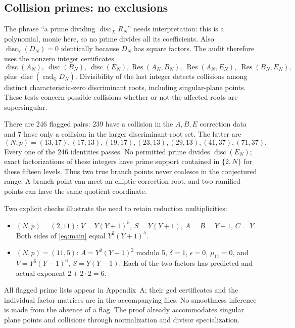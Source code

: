 \documentclass[11pt,a4paper]{article}
\begin{document}
\subsection{Collision primes: no exclusions}
The phrase ``a prime dividing $\operatorname{disc}_X R_N$'' needs interpretation: this is a polynomial, monic here, so no prime divides all its coefficients. Also $\operatorname{disc}_Y(D_N)=0$ identically because $D_N$ has square factors. The audit therefore uses the nonzero integer certificates
\[
 \operatorname{disc}(A_N),\ \operatorname{disc}(B_N),\ \operatorname{disc}(E_N),
 \operatorname{Res}(A_N,B_N),\ \operatorname{Res}(A_N,E_N),\ \operatorname{Res}(B_N,E_N),
\]
plus $\operatorname{disc}(\operatorname{rad}_{\mathbb Q}D_N)$. Divisibility of the last integer detects collisions among distinct characteristic-zero discriminant roots, including singular-plane points. These tests concern possible collisions whether or not the affected roots are supersingular.

There are 246 flagged pairs: 239 have a collision in the $A,B,E$ correction data and 7 have only a collision in the larger discriminant-root set. The latter are
\[
 (N,p)=(13,17),(17,13),(19,17),(23,13),(29,13),(41,37),(71,37).
\]
Every one of the 246 identities passes. No permitted prime divides $\operatorname{disc}(E_N)$; exact factorizations of these integers have prime support contained in $\{2,N\}$ for these fifteen levels. Thus two true branch points never coalesce in the conjectured range. A branch point can meet an elliptic correction root, and two ramified points can have the same quotient coordinate.

Two explicit checks illustrate the need to retain reduction multiplicities:
\begin{itemize}
\item $(N,p)=(2,11)$: $V=Y(Y+1)^5$, $S=Y(Y+1)$, $A=B=Y+1$, $C=Y$. Both sides of \eqref{eq:main} equal $Y^2(Y+1)^5$.
\item $(N,p)=(11,5)$: $A=Y^2(Y-1)^2$ modulo 5, $\delta=1$, $\epsilon=0$, $\mu_{11}=0$, and $V=Y^6(Y-1)^6$, $S=Y(Y-1)$. Each of the two factors has predicted and actual exponent $2+2\cdot2=6$.
\end{itemize}
All flagged prime lists appear in Appendix~A; their gcd certificates and the individual factor matrices are in the accompanying files. No smoothness inference is made from the absence of a flag. The proof already accommodates singular plane points and collisions through normalization and divisor specialization.
\end{document}
